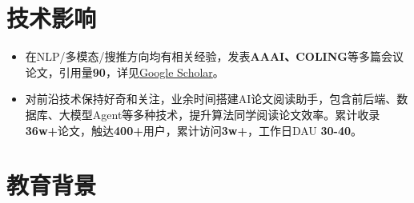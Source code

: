 \documentclass{resume}
\begin{document}
\section{技术影响}
\begin{itemize}[parsep=0.2ex]
  \item 在NLP/多模态/搜推方向均有相关经验，发表\textbf{AAAI、COLING}等多篇会议论文，引用量\textbf{90}，详见\href{https://scholar.google.com.hk/citations?hl=zh-CN&user=fKOITdsAAAAJ}{Google Scholar}。
  \item 对前沿技术保持好奇和关注，业余时间搭建AI论文阅读助手，包含前后端、数据库、大模型Agent等多种技术，提升算法同学阅读论文效率。累计收录\textbf{36w+}论文，触达\textbf{400+}用户，累计访问\textbf{3w+}，工作日DAU \textbf{30-40}。
\end{itemize}

\section{教育背景}
\end{document}
